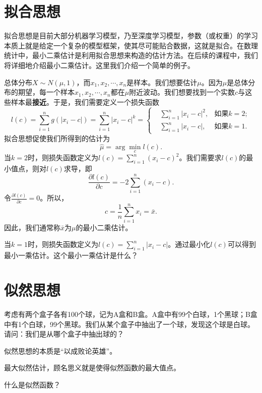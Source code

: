 \section{拟合思想}
拟合思想是目前大部分机器学习模型，乃至深度学习模型，参数（或权重）的学习本质上就是给定一个复杂的模型框架，使其尽可能贴合数据，这就是拟合。在数理统计中，最小二乘估计是利用拟合思想来构造的估计方法。在后续的课程中，我们将详细地介绍最小二乘估计。这里我们介绍一个简单的例子。
\begin{example}
总体分布$X\sim N(\mu,1)$，而$x_1,x_2,\cdots,x_n$是样本。我们想要估计$\mu$。因为$\mu$是总体分布的期望，每一个样本$x_1,x_2,\cdots,x_n$都在$\mu$附近波动。我们想要找到一个实数$c$与这些样本最\textbf{接近}。于是，我们需要定义一个损失函数
$$
l(c) = \sum_{i=1}^n g(|x_i - c|) = \sum_{i=1}^n |x_i - c|^{k} =\left\{
\begin{aligned}
&\sum_{i=1}^n |x_i - c|^2 , &\text{如果$k=2$};\\
&\sum_{i=1}^n |x_i - c| , &\text{如果$k=1$}.
\end{aligned}
\right.
$$
拟合思想促使我们所得到的估计为
$$
\hat{\mu} = \arg\min_{c} l(c).
$$
当$k=2$时，则损失函数定义为$l(c) = \sum_{i=1}^n (x_i-c)^2$。我们需要求$l(c)$的最小值点，则对$l(c)$求导，即
$$
\frac{\partial l(c)}{\partial c} = -2 \sum_{i=1}^n (x_i-c).
$$
令$\frac{\partial l(c)}{\partial c} = 0$。所以，
$$
c = \frac{1}{n} \sum_{i=1}^n x_i = \bar{x}.
$$
因此，我们通常称$\bar{x}$为$\mu$的最小二乘估计。
\end{example}
\begin{problem}
 当$k=1$时，则损失函数定义为$l(c) = \sum_{i=1}^n |x_i-c|$。通过最小化$l(c)$可以得到最小一乘估计。这个最小一乘估计是什么？
\end{problem}
\begin{note}
    \vspace{5cm}
\end{note}

\section{似然思想}
\begin{problem}
 考虑有两个盒子各有100个球，记为A盒和B盒。A盒中有99个白球，1个黑球；B盒中有1个白球，99个黑球。我们从某个盒子中抽出了一个球，发现这个球是白球。请问：我们是从哪个盒子中抽出球的？   
\end{problem}
\begin{remark}
    似然思想的本质是“以成败论英雄”。
\end{remark}

最大似然估计，顾名思义就是使得似然函数的最大值点。
\begin{problem}
    什么是似然函数？
\end{problem}


